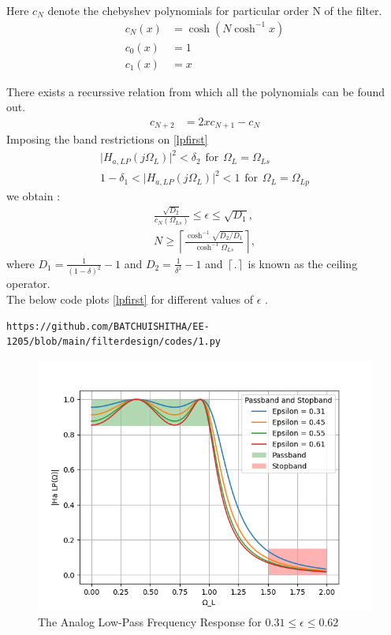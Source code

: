 \documentclass{article}
\begin{document}
\begin{enumerate}
Here $c_N$ denote the chebyshev polynomials for particular order N of the filter.
\begin{align}
c_N(x) &= \cosh(N \cosh^{-1}x) \\
c_0(x) &=  1 \\
c_1(x) &=  x
\end{align}
 
 There exists a recurssive relation from which all the polynomials can be found out.
\begin{align}
    c_{N+2} &= 2xc_{N+1} - c_{N}  \label{eq:cheby_poly_relation}
\end{align}
Imposing the band restrictions on \eqref{lpfirst} \\
\begin{align}
    \vert H_{a,LP}(j\Omega_L)\vert^2 < \delta_{2} \hspace{5pt} \text{for}\hspace{5pt} \Omega_L = \Omega_{Ls}\\
    1-\delta_{1}<\vert H_{a,LP}(j\Omega_L)\vert^2 < 1 \hspace{5pt} \text{for}\hspace{5pt} \Omega_L = \Omega_{Lp}
\end{align}
we obtain :
\begin{eqnarray}
\label{lpdesign}
\frac{\sqrt{D_2}}{c_N(\Omega_{Ls})} \leq \epsilon \leq \sqrt{D_1}, \nonumber \\
N \geq \left\lceil \frac{\cosh^{-1}\sqrt{D_2/D_1}}{\cosh^{-1}\Omega_{Ls}} \right\rceil,
\end{eqnarray}
where $D_1 = \frac{1}{(1 - \delta)^2}-1$ and $D_2 = \frac{1}{\delta^2} - 1$ and $\left \lceil . \right \rceil$ is known as the ceiling operator.\\ 

The below code plots \eqref{lpfirst} for different values of $\epsilon$ .
\begin{lstlisting}
https://github.com/BATCHUISHITHA/EE-1205/blob/main/filterdesign/codes/1.py
\end{lstlisting}
\begin{figure}[H]
\centering
\includegraphics[width=1\columnwidth]{figs/1.png}
\caption{The Analog Low-Pass Frequency Response for $0.31 \leq \epsilon \leq 0.62$}
\label{fig:H_for_diff_eb}
\end{figure}


\end{enumerate}
\end{document}
